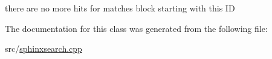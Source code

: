 there are no more hits for matches block starting with this I\-D 



The documentation for this class was generated from the following file\-:\begin{DoxyCompactItemize}
\item 
src/\hyperlink{sphinxsearch_8cpp}{sphinxsearch.\-cpp}\end{DoxyCompactItemize}
